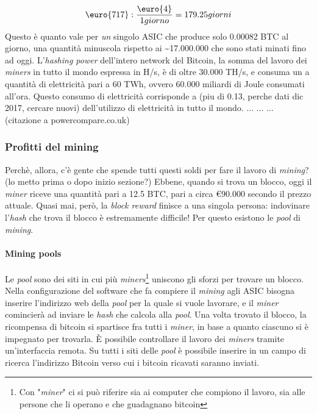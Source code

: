 \documentclass {article}
\begin{document}
$$\textup{\euro{717}} : \frac{\textup{\euro{4}}}{1 giorno} = 179.25 giorni$$
%
Questo è quanto vale per \emph{un} singolo ASIC che produce solo 0.00082 BTC al giorno, una quantità minuscola rispetto ai \textasciitilde 17.000.000 che sono stati minati fino ad oggi.
L'\textit{hashing power} dell'intero network del Bitcoin, la somma del lavoro dei \textit{miners} in tutto il mondo espressa in H/s, è di oltre 30.000 TH/s, e consuma un a quantità di elettricità pari a 60 TWh, ovvero 60.000 miliardi di Joule consumati all'ora.
Questo consumo di elettricità corrisponde a (piu di 0.13, perche dati dic 2017, cercare nuovi) dell'utilizzo di elettricità in tutto il mondo.
... ... ... (citazione a powercompare.co.uk)


\subsubsection {Profitti del mining}


Perchè, allora, c'è gente che spende tutti questi soldi per fare il lavoro di \textit{mining}? (lo metto prima o dopo inizio sezione?)
Ebbene, quando si trova un blocco, oggi il \textit{miner} riceve una quantità pari a 12.5 BTC, pari a circa \euro{90.000} secondo il prezzo attuale.
Quasi mai, però, la \textit{block reward} finisce a una singola persona: indovinare l'\textit{hash} che trova il blocco è estremamente difficile!
Per questo esistono le \textit{pool} di \textit{mining}.

\paragraph {Mining pools}

Le \textit{pool} sono dei siti in cui più \textit{miners}\footnote{Con "\textit{miner}" ci si può riferire sia ai computer che compiono il lavoro, sia alle persone che li operano e che guadagnano bitcoin} uniscono gli sforzi per trovare un blocco.
Nella configurazione del software che fa compiere il \textit{mining} agli ASIC bisogna inserire l'indirizzo web della \textit{pool} per la quale si vuole lavorare, e il \textit{miner} comincierà ad inviare le \textit{hash} che calcola alla \textit{pool}.
Una volta trovato il blocco, la ricompensa di bitcoin si spartisce fra tutti i \textit{miner}, in base a quanto ciascuno si è impegnato per trovarla.
È possibile controllare il lavoro dei \textit{miners} tramite un'interfaccia remota. Su tutti i siti delle \textit{pool} è possibile inserire in un campo di ricerca l'indirizzo Bitcoin verso cui i bitcoin ricavati saranno inviati.
\end{document}
